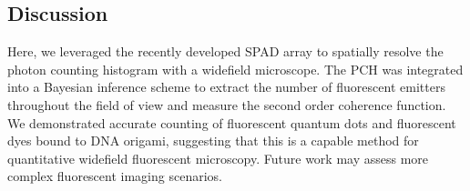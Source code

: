 \subsection{Discussion}




Here, we leveraged the recently developed SPAD array to spatially resolve the photon counting histogram with a widefield microscope. The PCH was integrated into a Bayesian inference scheme to extract the number of fluorescent emitters throughout the field of view and measure the second order coherence function. We demonstrated accurate counting of fluorescent quantum dots and fluorescent dyes bound to DNA origami, suggesting that this is a capable method for quantitative widefield fluorescent microscopy. Future work may assess more complex fluorescent imaging scenarios. 

